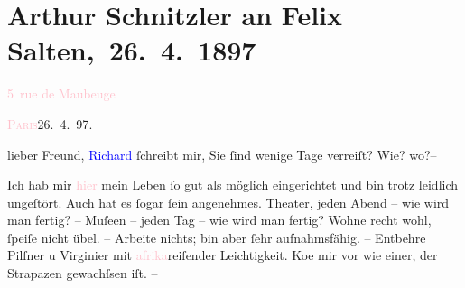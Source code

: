 

\renewcommand{\erwaehntePersonen}{Personen: Richard Beer-Hofmann, Marie Reinhard, Felix Salten}
\renewcommand{\erwaehnteOrte}{Orte: Afrika, Paris, Wien, rue de Maubeuge}
\renewcommand{\erwaehnteWerke}{}
\section[ Arthur Schnitzler an Felix Salten, 26. 4. 1897]{Arthur Schnitzler an Felix Salten, 26. 4. 1897}
\nopagebreak{}
\rehead{ }\normalsize\beginnumbering{}
\toendnotes[C]{\smallbreak\pagebreak[2]}
\toendnotes[C]{\smallbreak}
\pstart
           \noindent{}\raggedleft{}{\pb}\textcolor{pink}{5 rue de Maubeuge}{}\ledrightnote{\textcolor{pink}{rue de Maubeuge}}\pend
           
\pstart
           \raggedleft{}\textsc{\textcolor{pink}{Paris}{}\ledrightnote{\textcolor{pink}{Paris}}{ }26. 4. 97}. \pend
           
\pstart{}lieber Freund,\pend
\pstart
           \textcolor{blue}{Richard}{}\ledrightnote{\textcolor{blue}{Richard Beer-Hofmann}} ſchreibt mir, Sie ſind wenige Tage
               verreiſt? Wie? wo?–\pend
           
\pstart
           Ich hab mir \textcolor{pink}{hier}{}\ledrightnote{{$\rightarrow$}\textcolor{pink}{Paris}} mein Leben ſo
               gut als möglich eingerichtet und bin trotz \label{K_L02963-1v}\label{K_L02963-1h} leidlich {\pb}ungeſtört. Auch hat es ſogar ſein angenehmes.
               Theater, jeden Abend – wie wird man fertig? – Muſeen – jeden Tag – wie wird man
               fertig? Wohne recht wohl, ſpeiſe nicht übel. – Arbeite nichts; bin aber ſehr
               aufnahmsfähig. – {\pb}Entbehre Pilſner u
               Virginier mit \textcolor{pink}{afrika}{}\ledrightnote{\textcolor{pink}{Afrika}}reiſender Leichtigkeit.
                  Ko{\geminationm}e mir vor wie einer, der Strapazen gewachſsen iſt.
               –\pend
           
